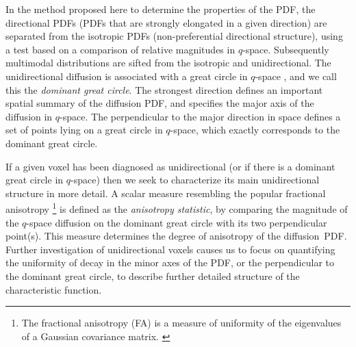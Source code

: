 \documentclass[dvips,aoas,preprint]{imsart}
\numberwithin{equation}{section}
\theoremstyle{plain}
\begin{document}
In the method proposed here to determine the properties of the PDF, the directional PDFs (PDFs that are strongly elongated in a given direction) are separated
from the isotropic PDFs (non-preferential directional structure), using a test based on a comparison of relative
magnitudes in $q$-space. Subsequently multimodal distributions are sifted
from the isotropic and unidirectional.  The unidirectional diffusion
is associated with a great circle in $q$-space \citep{Tuch}, and we
call this the {\em dominant great circle}.   The strongest direction defines an important spatial summary of the diffusion PDF, and specifies the major axis of the diffusion in $q$-space. The perpendicular to the major direction in space defines a set of points lying on a great circle in $q$-space, which exactly corresponds to the dominant great circle. 


If a given voxel has been
diagnosed as unidirectional (or if there is a dominant great circle in $q$-space) then we seek to characterize its main
unidirectional structure in more detail.
A scalar measure resembling the popular
fractional anisotropy \footnote{The fractional anisotropy (FA) is a measure of uniformity of the eigenvalues of a Gaussian covariance matrix. \citep{bas:FA}} is defined as the {\em anisotropy statistic}, by comparing the magnitude of the $q$-space diffusion on
the dominant great circle with its two perpendicular point(s).  This measure determines the degree
of anisotropy of the diffusion~PDF. 
Further investigation of unidirectional voxels causes us to focus on
quantifying the uniformity of decay in the minor axes of the PDF,
or the perpendicular to the dominant great circle, to describe further detailed structure of the characteristic function.
\end{document}
